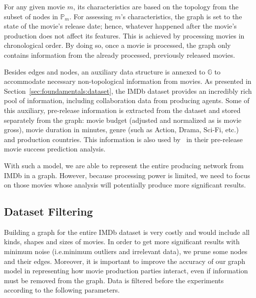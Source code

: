 For any given movie $m$, its characteristics are based on the topology from the
subset of nodes in $\mathbb{P}_m$. For assessing $m$'s characteristics, the
graph is set to the state of the movie's release date; hence, whatever happened
after the movie's production does not affect its features. This is achieved by
processing movies in chronological order. By doing so, once a movie is
processed, the graph only contains information from the already processed,
previously released movies.

Besides edges and nodes, an auxiliary data structure is annexed to $\mathbb{G}$
to accommodate necessary non-topological information from movies. As presented
in Section~\ref{sec:foundamentals:dataset}, the IMDb dataset provides an
incredibly rich pool of information, including collaboration data from
producing agents. Some of this auxiliary, pre-release information is extracted
from the dataset and stored separately from the graph: movie budget (adjusted
and normalized as is movie gross), movie duration in minutes, genre (such as
Action, Drama, Sci-Fi, etc.) and production countries. This information is also
used by~\cite{Ghiassi2015} in their pre-release movie success prediction
analysis.

With such a model, we are able to represent the entire producing network from
IMDb in a graph. However, because processing power is limited, we need to focus
on those movies whose analysis will potentially produce more significant
results.

\subsection{Dataset Filtering}
\label{sec:filter}
Building a graph for the entire IMDb dataset is very costly and would include
all kinds, shapes and sizes of movies. In order to get more significant results
with minimum noise (i.e.\@ minimum outliers and irrelevant data), we prune some
nodes and their edges. Moreover, it is important to improve the accuracy of our
graph model in representing how movie production parties interact, even if
information must be removed from the graph. Data is filtered before the
experiments according to the following parameters.

